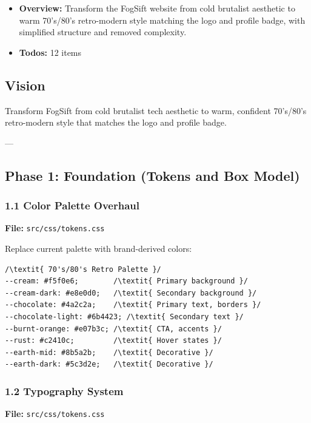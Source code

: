 \documentclass{book}
\begin{document}
\begin{itemize}
\begin{itemize}
\begin{itemize}
\begin{itemize}
\begin{itemize}
\begin{itemize}
\begin{itemize}
\begin{itemize}
\begin{itemize}
\begin{itemize}
\item \textbf{Overview:} Transform the FogSift website from cold brutalist aesthetic to warm 70's/80's retro-modern style matching the logo and profile badge, with simplified structure and removed complexity.
\item \textbf{Todos:} 12 items
\end{itemize}


\subsection{Vision}
Transform FogSift from cold brutalist tech aesthetic to warm, confident 70's/80's retro-modern style that matches the logo and profile badge.

---

\subsection{Phase 1: Foundation (Tokens and Box Model)}

\subsubsection{1.1 Color Palette Overhaul}
\textbf{File:} \texttt{src/css/tokens.css}

Replace current palette with brand-derived colors:

\begin{verbatim}
/\textit{ 70's/80's Retro Palette }/
--cream: #f5f0e6;        /\textit{ Primary background }/
--cream-dark: #e8e0d0;   /\textit{ Secondary background }/
--chocolate: #4a2c2a;    /\textit{ Primary text, borders }/
--chocolate-light: #6b4423; /\textit{ Secondary text }/
--burnt-orange: #e07b3c; /\textit{ CTA, accents }/
--rust: #c2410c;         /\textit{ Hover states }/
--earth-mid: #8b5a2b;    /\textit{ Decorative }/
--earth-dark: #5c3d2e;   /\textit{ Decorative }/

\end{verbatim}

\subsubsection{1.2 Typography System}
\textbf{File:} \texttt{src/css/tokens.css}

\end{itemize}
\end{itemize}
\end{itemize}
\end{itemize}
\end{itemize}
\end{itemize}
\end{itemize}
\end{itemize}
\end{itemize}
\end{document}
